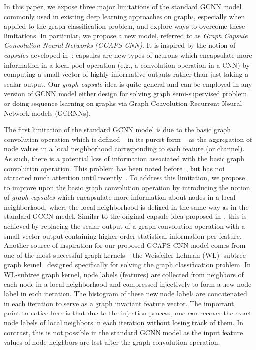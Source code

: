 \documentclass{article}
\begin{document}
In this paper, we  expose three major limitations of the standard GCNN model commonly used in existing deep learning approaches on graphs, especially when applied to the graph classification  problem, and explore ways to overcome these limitations. In particular, we propose a new model, referred to as {\em Graph Capsule Convolution Neural Networks (GCAPS-CNN)}. It is  inspired by the notion of {\em capsules} developed in~\cite{hinton2011transforming}: capsules are new types of neurons which encapsulate more information in a local pool operation (e.g., a convolution operation in a CNN)  by computing a small vector of highly informative  outputs rather than just taking a scalar output. Our {\em graph capsule} idea is quite general and can be employed in any version of GCNN model either design for solving  graph semi-supervised problem or doing sequence learning on graphs via Graph Convolution Recurrent Neural Network models (GCRNNs).  


 The first limitation of the standard GCNN model  is due to the basic graph convolution operation which is defined -- in its purest form -- as the aggregation of node values in a local neighborhood corresponding to each feature (or channel). As such,  there is a potential loss of information associated with  the basic graph convolution operation.  
This problem has been noted  before~\cite{hinton2011transforming}, but has not attracted much attention  until recently~\cite{sabour2017dynamic}. To address this limitation, we  propose to improve upon the basic graph convolution operation by introducing the notion of {\em graph capsules} which encapsulate more information about nodes in a local neighborhood, where the local neighborhood is defined in the same way as in the standard GCCN model. Similar to the original capsule idea proposed in~\cite{hinton2011transforming}, this is achieved by replacing the scalar output  of a graph convolution operation  with a small vector output containing higher order statistical information per feature. Another source of inspiration for our proposed GCAPS-CNN model comes from one of the most successful graph kernels -- the Weisfeiler-Lehman (WL)- subtree graph kernel~\cite{shervashidze2011weisfeiler} designed specifically for solving the graph classification problem.
 In WL-subtree graph kernel, node labels  (features) are collected from neighbors of each node in a local neighborhood  and  compressed injectively to form a new node label in each iteration. The histogram of these new node labels are concatenated in each iteration to serve  as a  graph invariant feature vector. The important point to notice here  is that  due to the injection process, one can recover  the exact node labels of local neighbors in each iteration without losing  track of them. In contrast, this is not possible in the standard GCNN model as the   input feature values of node neighbors are lost  after the graph convolution operation.
\end{document}
